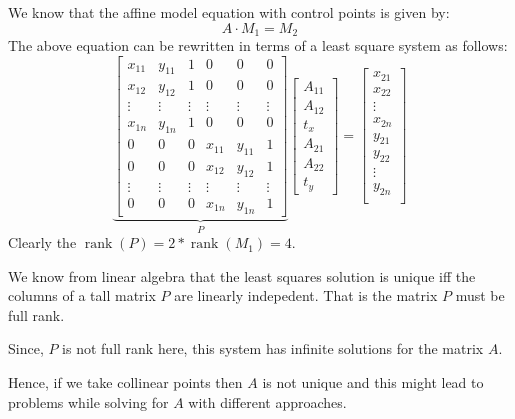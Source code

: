 \documentclass[a4paper]{article}
\begin{document}
We know that the affine model equation with control points is given by:
\begin{equation}
	A\cdot M_1 = M_2%
\end{equation}
The above equation can be rewritten in terms of a least square system as follows:
\begin{equation}
	\underbrace{
	\begin{bmatrix}
		x_{11} & y_{11} & 1 & 0 & 0 & 0\\
		x_{12} & y_{12} & 1 & 0 & 0 & 0\\
		\vdots & \vdots & \vdots & \vdots & \vdots & \vdots \\
		x_{1n} & y_{1n} & 1 & 0 & 0 & 0\\
		0 & 0 & 0 & x_{11} & y_{11} & 1\\
		0 & 0 & 0 & x_{12} & y_{12} & 1\\
		\vdots & \vdots & \vdots & \vdots & \vdots & \vdots \\
		0 & 0 & 0 & x_{1n} & y_{1n} & 1
	\end{bmatrix}}_{P}
	\begin{bmatrix}
		A_{11}\\A_{12}\\t_x\\A_{21}\\A_{22}\\t_y
	\end{bmatrix}
	=
	\begin{bmatrix}
		x_{21}\\
		x_{22}\\
		\vdots\\
		x_{2n}\\
		y_{21}\\
		y_{22}\\
		\vdots\\
		y_{2n}\\
	\end{bmatrix}
\end{equation}
Clearly the $\operatorname{rank}(P)=2*\operatorname{rank}(M_1)=4$.

We know from linear algebra that the least squares solution is unique iff the columns of a tall matrix $P$ are linearly indepedent. That is the matrix $P$ must be full rank. 

Since, $P$ is not full rank here, this system has infinite solutions for the matrix $A$. 

Hence, if we take collinear points then $A$ is not unique and this might lead to problems while solving for $A$ with different approaches.
\end{document}
